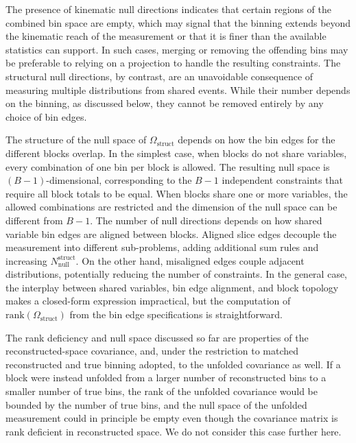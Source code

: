 \documentclass[a4paper,11pt]{article}
\begin{document}
The presence of kinematic null directions indicates that certain regions of the combined bin space are empty, which may signal that the binning extends beyond the kinematic reach of the measurement or that it is finer than the available statistics can support. In such cases, merging or removing the offending bins may be preferable to relying on a projection to handle the resulting constraints. The structural null directions, by contrast, are an unavoidable consequence of measuring multiple distributions from shared events. While their number depends on the binning, as discussed below, they cannot be removed entirely by any choice of bin edges.


The structure of the null space of $\Omega_{\text{struct}}$ depends on how the bin edges for the different blocks overlap. In the simplest case, when blocks do not share variables, every combination of one bin per block is allowed. The resulting null space is $(B-1)$-dimensional, corresponding to the $B-1$ independent constraints that require all block totals to be equal. When blocks share one or more variables, the allowed combinations are restricted and the dimension of the null space can be different from $B-1$. The number of null directions depends on how shared variable bin edges are aligned between blocks. Aligned slice edges decouple the measurement into different sub-problems, adding additional sum rules and increasing $N_{\text{null}}^{\text{struct}}$. On the other hand, misaligned edges couple adjacent distributions, potentially reducing the number of constraints. In the general case, the interplay between shared variables, bin edge alignment, and block topology makes a closed-form expression impractical, but the computation of $\mathrm{rank}(\Omega_{\text{struct}})$ from the bin edge specifications is straightforward.

The rank deficiency and null space discussed so far are properties of the reconstructed-space covariance, and, under the restriction to matched reconstructed and true binning adopted, to the unfolded covariance as well. If a block were instead unfolded from a larger number of reconstructed bins to a smaller number of true bins, the rank of the unfolded covariance would be bounded by the number of true bins, and the null space of the unfolded measurement could in principle be empty even though the covariance matrix is rank deficient in reconstructed space. We do not consider this case further here.
\end{document}
